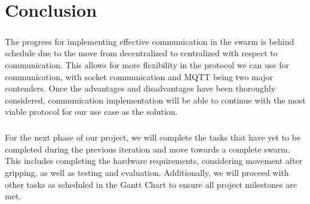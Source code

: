 \chapter{Conclusion}

\paragraph*{}
The progress for implementing effective communication in the swarm is behind schedule due to the move from decentralized to centralized with respect to communication. This allows for more flexibility in the protocol we can use for communication, with socket communication and MQTT being two major contenders. Once the advantages and disadvantages have been thoroughly considered, communication implementation will be able to continue with the most viable protocol for our use case as the solution. 

\paragraph*{}
For the next phase of our project, we will complete the tasks that have yet to be completed during the previous iteration and move towards a complete swarm. This includes completing the hardware requirements, considering movement after gripping, as well as testing and evaluation. Additionally, we will proceed with other tasks as scheduled in the Gantt Chart to ensure all project milestones are met.
